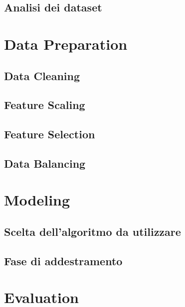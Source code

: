 \documentclass[a4paper, 12pt]{report}
\begin{document}
    \section{Analisi dei dataset}\label{sec:analisi-dei-dataset}


    \chapter{Data Preparation}\label{ch:data-preparation}


    \section{Data Cleaning}\label{sec:data-cleaning}


    \section{Feature Scaling}\label{sec:feature-scaling}


    \section{Feature Selection}\label{sec:feature-selection}


    \section{Data Balancing}\label{sec:data-balancing}


    \chapter{Modeling}\label{ch:modeling}


    \section{Scelta dell'algoritmo da utilizzare}\label{sec:scelta-dell'algoritmo-da-utilizzare}


    \section{Fase di addestramento}\label{sec:fase-di-addestramento}


    \chapter{Evaluation}\label{ch:evaluation}
\end{document}
